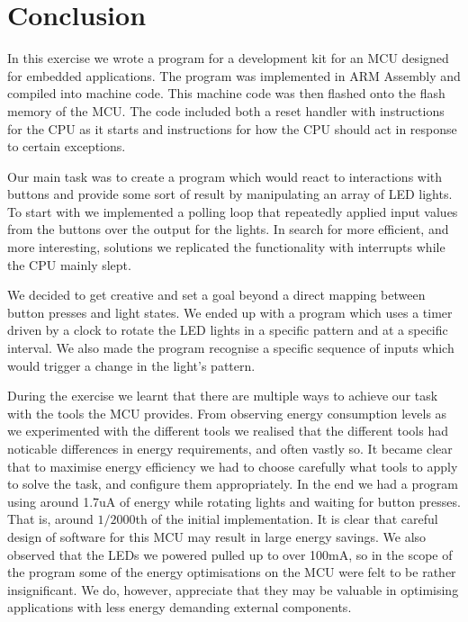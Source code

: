 \chapter{Conclusion}

In this exercise we wrote a program for a development kit for an MCU designed
for embedded applications. The program was implemented in ARM Assembly and
compiled into machine code. This machine code was then flashed onto the flash
memory of the MCU. The code included both a reset handler with instructions for
the CPU as it starts and instructions for how the CPU should act in response to
certain exceptions.

Our main task was to create a program which would react to interactions with
buttons and provide some sort of result by manipulating an array of LED lights.
To start with we implemented a polling loop that repeatedly applied input values
from the buttons over the output for the lights. In search for more efficient,
and more interesting, solutions we replicated the functionality with interrupts
while the CPU mainly slept.

We decided to get creative and set a goal beyond a direct mapping between button
presses and light states. We ended up with a program which uses a timer driven
by a clock to rotate the LED lights in a specific pattern and at a specific
interval. We also made the program recognise a specific sequence of inputs which
would trigger a change in the light's pattern.

During the exercise we learnt that there are multiple ways to achieve our task
with the tools the MCU provides. From observing energy consumption levels as we
experimented with the different tools we realised that the different tools had
noticable differences in energy requirements, and often vastly so. It became
clear that to maximise energy efficiency we had to choose carefully what tools
to apply to solve the task, and configure them appropriately. In the end we had
a program using around 1.7uA of energy while rotating lights and waiting for
button presses. That is, around \(1/2000\)th of the initial implementation. It
is clear that careful design of software for this MCU may result in large energy
savings. We also observed that the LEDs we powered pulled up to over 100mA, so
in the scope of the program some of the energy optimisations on the MCU were
felt to be rather insignificant. We do, however, appreciate that they may be
valuable in optimising applications with less energy demanding external
components.
